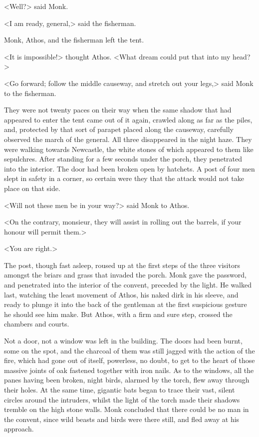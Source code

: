 <Well?> said Monk.

<I am ready, general,> said the fisherman.

Monk, Athos, and the fisherman left the tent.

<It is impossible!> thought Athos. <What dream could put that into my head?>

<Go forward; follow the middle causeway, and stretch out your legs,> said Monk to the fisherman.

They were not twenty paces on their way when the same shadow that had appeared to enter the tent came out of it again, crawled along as far as the piles, and, protected by that sort of parapet placed along the causeway, carefully observed the march of the general. All three disappeared in the night haze. They were walking towards Newcastle, the white stones of which appeared to them like sepulchres. After standing for a few seconds under the porch, they penetrated into the interior. The door had been broken open by hatchets. A post of four men slept in safety in a corner, so certain were they that the attack would not take place on that side.

<Will not these men be in your way?> said Monk to Athos.

<On the contrary, monsieur, they will assist in rolling out the barrels, if your honour will permit them.>

<You are right.>

The post, though fast asleep, roused up at the first steps of the three visitors amongst the briars and grass that invaded the porch. Monk gave the password, and penetrated into the interior of the convent, preceded by the light. He walked last, watching the least movement of Athos, his naked dirk in his sleeve, and ready to plunge it into the back of the gentleman at the first suspicious gesture he should see him make. But Athos, with a firm and sure step, crossed the chambers and courts.

Not a door, not a window was left in the building. The doors had been burnt, some on the spot, and the charcoal of them was still jagged with the action of the fire, which had gone out of itself, powerless, no doubt, to get to the heart of those massive joints of oak fastened together with iron nails. As to the windows, all the panes having been broken, night birds, alarmed by the torch, flew away through their holes. At the same time, gigantic bats began to trace their vast, silent circles around the intruders, whilst the light of the torch made their shadows tremble on the high stone walls. Monk concluded that there could be no man in the convent, since wild beasts and birds were there still, and fled away at his approach.

